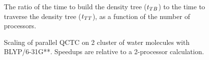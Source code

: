 \commentoutA{\documentclass[prl,aps,twocolumn,twocolumngrid,superbib]{revtex4}}
\begin{document}
\begin{figure}[t]
\caption{ 
The ratio of the time to build the density tree ($t_{TB}$) to the time
to traverse the density tree ($t_{TT}$), as a function of the number of
processors.  }
\label{fig:time_ratio}
\end{figure}

\begin{figure}[t]
\caption{ 
Scaling of parallel QCTC on 2 cluster of water molecules with
BLYP/6-31G**. Speedups are relative to a 2-processor calculation.  }
\label{110And200WaterOnGood}
\end{figure}
\end{document}

